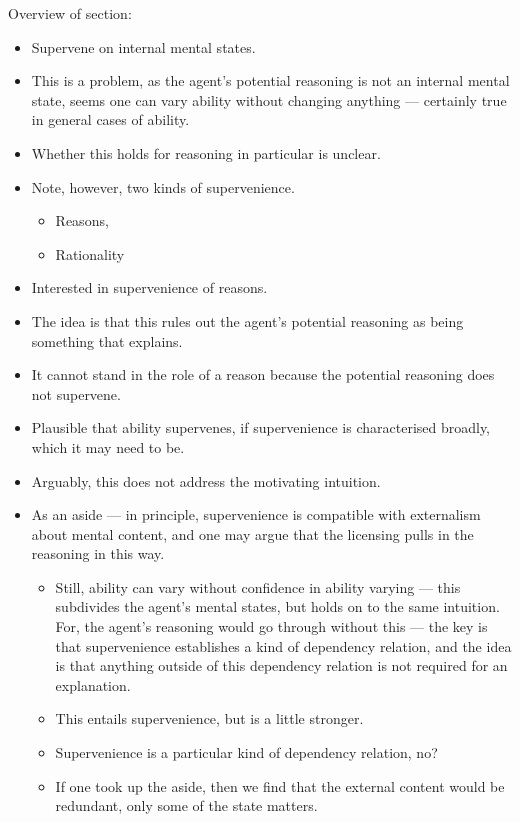 \documentclass[10pt]{article}
\begin{document}
\begin{note}[Structure]
  Overview of section:
  \begin{itemize}
  \item Supervene on internal mental states.
  \item This is a problem, as the agent's potential reasoning is not an internal mental state, seems one can vary ability without changing anything --- certainly true in general cases of ability.
  \item Whether this holds for reasoning in particular is unclear.
  \item Note, however, two kinds of supervenience.
    \begin{itemize}
    \item Reasons,
    \item Rationality
    \end{itemize}
  \item Interested in supervenience of reasons.
  \item The idea is that this rules out the agent's potential reasoning as being something that explains.
  \item It cannot stand in the role of a reason because the potential reasoning does not supervene.
  \item Plausible that ability supervenes, if supervenience is characterised broadly, which it may need to be.
  \item Arguably, this does not address the motivating intuition.
  \item As an aside --- in principle, supervenience is compatible with externalism about mental content, and one may argue that the licensing pulls in the reasoning in this way.
    \begin{itemize}
    \item Still, ability can vary without confidence in ability varying --- this subdivides the agent's mental states, but holds on to the same intuition.
      For, the agent's reasoning would go through without this --- the key is that supervenience establishes a kind of dependency relation, and the idea is that anything outside of this dependency relation is not required for an explanation.
    \item This entails supervenience, but is a little stronger.
    \item Supervenience is a particular kind of dependency relation, no?
    \item If one took up the aside, then we find that the external content would be redundant, only some of the state matters.

\end{itemize}
\end{itemize}
\end{note}
\end{document}
